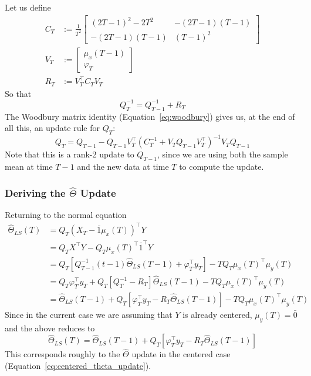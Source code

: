 Let us define
\begin{align}
  C_T &:= \frac{1}{T^2}
  \begin{bmatrix}
    (2T - 1)^2 - 2T^2 & -(2T - 1)(T - 1) \\
    -(2T - 1)(T - 1) & (T - 1)^2
  \end{bmatrix} \\
  V_T &:= 
  \begin{bmatrix}
    \mu_x(T - 1) \\
    \varphi_T
  \end{bmatrix} \\
  R_T &:= V_T^\top C_T V_T
\end{align}
So that 
\begin{equation}
  \label{eq:Q_T_inv}
  Q_T^{-1} = Q_{T - 1}^{-1} + R_T
\end{equation}
The Woodbury matrix identity (Equation~\ref{eq:woodbury}) gives us, at the end
of all this, an update rule for $Q_T$:
\begin{equation}
  Q_T = Q_{T - 1} - Q_{T - 1}V_T^\top\left(C_T^{-1} + V_TQ_{T-1}V_T^\top\right)^{-1}V_TQ_{T-1} \label{eq:uncentered_Q_T_update}
\end{equation}
Note that this is a rank-2 update to $Q_{T-1}$, since we are using both the
sample mean at time $T - 1$ and the new data at time $T$ to compute the update.

\subsubsection{Deriving the $\hat\Theta$ Update}
Returning to the normal equation
\begin{align}
  \hat\Theta_{LS}(T) &= Q_T (X_T - \bar{1} \mu_x(T))^\top Y \\
                     &= Q_TX^\top Y - Q_T \mu_x(T)^\top\bar{1}^\top Y \\
                     &= Q_T\left[Q_{T-1}^{-1}(t-1)\hat\Theta_{LS}(T-1) + \varphi_T^\top y_T\right] - TQ_T\mu_x(T)^\top \mu_y(T) \\
                     &= Q_T \varphi_T^\top y_T + Q_T\left[Q_{T}^{-1} - R_T\right]\hat\Theta_{LS}(T-1) - TQ_T\mu_x(T)^\top\mu_y(T) \\
                     &= \hat\Theta_{LS}(T-1) + Q_T\left[\varphi_T^\top y_T - R_T\hat\Theta_{LS}(T-1)\right] - TQ_T\mu_x(T)^\top \mu_y(T) \label{eq:uncentered_x_theta_with_correction}
\end{align}
Since in the current case we are assuming that $Y$ is already centered,
$\mu_y(T) = \bar{0}$ and the above reduces to
\begin{equation}
  \hat\Theta_{LS}(T) = \hat\Theta_{LS}(T-1) + Q_T\left[\varphi_T^\top y_T - R_T\hat\Theta_{LS}(T-1)\right] \label{eq:uncentered_x_theta_update}
\end{equation}
This corresponds roughly to the $\hat\Theta$ update in the centered case (Equation~\ref{eq:centered_theta_update}).

